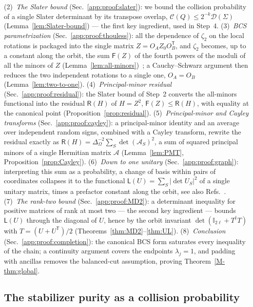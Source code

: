 \documentclass[aps,prl,twocolumn,superscriptaddress,reprint,longbibliography,nofootinbib]{revtex4-2}
\newcommand{\trans}{\mathsf{T}}
\begin{document}
(2)~\emph{The Slater bound}  (Sec.~\ref{app:proof:slater}): we bound the collision probability of a single Slater determinant by its transpose overlap, $\mathcal{C}(Q)\le2^{-k}\mathcal{D}(\Sigma)$ (Lemma~\ref{lem:Slater-bound}) --- the first key ingredient, used in Step~4.
(3)~\emph{BCS parametrization} (Sec.~\ref{app:proof:thouless}): all the dependence of $\zeta_2$ on the local rotations is packaged into the single matrix $Z=O_AZ_0O_B^{\trans}$, and $\zeta_2$ becomes, up to a constant along the orbit, the sum $\mathsf{F}(Z)$ of the fourth powers of the moduli of all the minors of $Z$ (Lemma~\ref{lem:all-minors})~\cite{Mbeng2024,surace}; a Cauchy--Schwarz argument then reduces the two independent rotations to a single one, $O_A=O_B$  (Lemma~\ref{lem:two-to-one}).
(4)~\emph{Principal-minor residual} (Sec.~\ref{app:proof:residual}): the Slater bound of Step~2  converts the all-minors functional into the residual  $\mathsf{R}(H)$ of $H=Z^2$, $\mathsf{F}(Z)\le\mathsf{R}(H)$, with equality at the canonical point (Proposition~\ref{prop:residual}).
(5)~\emph{Principal-minor and Cayley transforms} (Sec.~\ref{app:proof:cayley}): a principal-minor identity and an average over independent random signs, combined with a Cayley transform, rewrite the residual exactly as $\mathsf{R}(H)=\Delta_\Omega^{-2}\sum_S\det(\mathcal{A}_S)^2$, a sum of squared principal minors of a single Hermitian matrix $\mathcal{A}$ (Lemma~\ref{lem:PMT}, Proposition~\ref{prop:Cayley}).
(6)~\emph{Down to one unitary} (Sec.~\ref{app:proof:graph}): interpreting this sum as a probability, a change of basis within pairs of coordinates collapses it to the functional $\mathsf{L}(U)=\sum_S|\det U_S|^2$ of a single unitary matrix, times a prefactor constant along the orbit, see also Refs.~\cite{collura2026nonstabilizernessfermionicgaussianstates,sfeo}.
(7)~\emph{The rank-two bound} (Sec.~\ref{app:proof:MD2}): a determinant inequality for positive matrices of rank at most two --- the second key ingredient --- bounds $\mathsf{L}(U)$ through the diagonal of $U$, hence by the orbit invariant $\det(\mathbb{I}_{2\ell}+T^\dagger T)$ with $T=(U+U^{\trans})/2$ (Theorems~\ref{thm:MD2}--\ref{thm:UL}).
(8)~\emph{Conclusion} (Sec.~\ref{app:proof:completion}): the canonical BCS form saturates every inequality of the chain; a continuity argument covers the endpoints $\lambda_j=1$, and padding with ancillas removes the balanced-cut assumption, proving Theorem~\ref{M-thm:global}.


\subsection{The stabilizer purity as a collision probability}
\label{app:proof:dpp}
\end{document}
